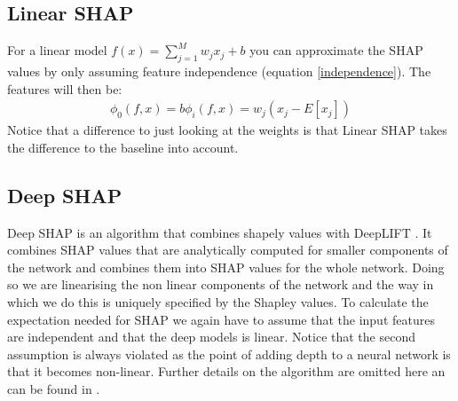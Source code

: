 \documentclass[conference]{IEEEtran}
\begin{document}
\subsection{Linear SHAP}
For a linear model $f(x) = \sum_{j=1}^M w_j x_j + b$ you can approximate the SHAP values by only assuming feature independence (equation \ref{independence}).
The features will then be:
\begin{align}
\phi_0(f,x) = b
\phi_i(f,x) = w_j(x_j - E[x_j]) 
\end{align}
Notice that a difference to just looking at the weights is that Linear SHAP takes the difference to the baseline into account.

\subsection{Deep SHAP}
Deep SHAP \cite{b2} is an algorithm that combines shapely values with DeepLIFT \cite{b5}.
It combines SHAP values that are analytically computed for smaller components of the network and combines them into SHAP values for the whole network. Doing so we are linearising the non linear components of the network and the way in which we do this is uniquely specified by the Shapley values.
To calculate the expectation needed for SHAP we again have to assume that the input features are independent and that the deep models is linear. 
Notice that the second assumption is always violated as the point of adding depth to a neural network is that it becomes non-linear.
Further details on the algorithm are omitted here an can be found in \cite{b2}.
\end{document}
